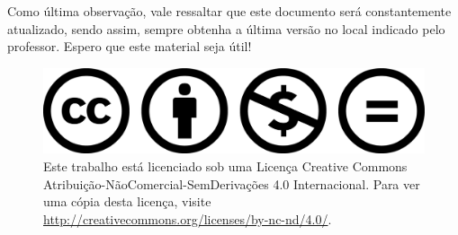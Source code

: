 Como última observação, vale ressaltar que este documento será constantemente atualizado, sendo assim, sempre obtenha a última versão no local indicado pelo professor. Espero que este material seja útil!

\vspace*{\fill}

\FloatBarrier
\begin{figure}[!htbp]
    \centering
    \includegraphics[scale=0.1]{imagens/logoCC}
    \\
    Este trabalho está licenciado sob uma Licença Creative Commons Atribuição-NãoComercial-SemDerivações 4.0 Internacional. Para ver uma cópia desta licença, visite \textcolor{blue}{\url{http://creativecommons.org/licenses/by-nc-nd/4.0/}}.
\end{figure}
\FloatBarrier
